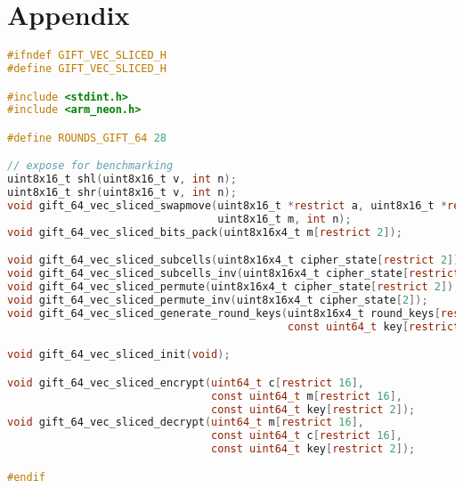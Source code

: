 \chapter{Appendix}

\begin{lstlisting}[language=c, caption={gift\_vec\_sliced.h}]
#ifndef GIFT_VEC_SLICED_H
#define GIFT_VEC_SLICED_H

#include <stdint.h>
#include <arm_neon.h>

#define ROUNDS_GIFT_64 28

// expose for benchmarking
uint8x16_t shl(uint8x16_t v, int n);
uint8x16_t shr(uint8x16_t v, int n);
void gift_64_vec_sliced_swapmove(uint8x16_t *restrict a, uint8x16_t *restrict b,
                                 uint8x16_t m, int n);
void gift_64_vec_sliced_bits_pack(uint8x16x4_t m[restrict 2]);

void gift_64_vec_sliced_subcells(uint8x16x4_t cipher_state[restrict 2]);
void gift_64_vec_sliced_subcells_inv(uint8x16x4_t cipher_state[restrict 2]);
void gift_64_vec_sliced_permute(uint8x16x4_t cipher_state[restrict 2]);
void gift_64_vec_sliced_permute_inv(uint8x16x4_t cipher_state[2]);
void gift_64_vec_sliced_generate_round_keys(uint8x16x4_t round_keys[restrict ROUNDS_GIFT_64][2],
                                            const uint64_t key[restrict 2]);

void gift_64_vec_sliced_init(void);

void gift_64_vec_sliced_encrypt(uint64_t c[restrict 16],
                                const uint64_t m[restrict 16],
                                const uint64_t key[restrict 2]);
void gift_64_vec_sliced_decrypt(uint64_t m[restrict 16],
                                const uint64_t c[restrict 16],
                                const uint64_t key[restrict 2]);

#endif
\end{lstlisting}

